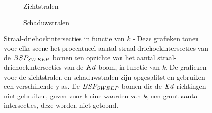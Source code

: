 \begin{figure}
  \centering
  \begin{subfigure}{\linewidth}
  \centering
  \begin{subfigure}[t]{.32\linewidth}
    \centering
{}
  \end{subfigure}
  \begin{subfigure}[t]{.32\linewidth}
    \centering
{}
\end{subfigure}
\begin{subfigure}[t]{.32\linewidth}
  \centering
{}
\end{subfigure}
\caption{Zichtstralen}
\end{subfigure}
\begin{subfigure}{\linewidth}
  \centering
  \begin{subfigure}[t]{.32\linewidth}
    \centering
{}
  \end{subfigure}
  \begin{subfigure}[t]{.32\linewidth}
    \centering
{}
\end{subfigure}
\begin{subfigure}[t]{.32\linewidth}
  \centering
{}
\end{subfigure}
\caption{Schaduwstralen}
\end{subfigure}
\caption[Straal-driehoekintersecties in functie van $k$]{Straal-driehoekintersecties in functie van $k$ - \small Deze grafieken tonen voor elke scene het procentueel aantal straal-driehoekintersecties van de $BSP_{SWEEP}$ bomen ten opzichte van het aantal straal-driehoekintersecties van de $Kd$ boom, in functie van $k$. De grafieken voor de zichtstralen en schaduwstralen zijn opgesplitst en gebruiken een verschillende y-as. De $BSP_{SWEEP}$ bomen die de $Kd$ richtingen niet gebruiken, geven voor kleine waarden van $k$, een groot aantal intersecties, deze worden niet getoond.}
\label{fig:k-intersecties}
\end{figure}

